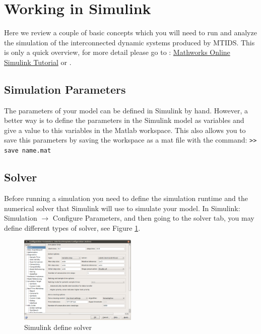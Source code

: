 \documentclass[a4paper,twoside, openright,12pt]{report}
\begin{document}
 

\section{Working in Simulink}\label{workinginsimulink}

Here we review a couple of basic concepts which you will need to run and analyze the simulation of the interconnected dynamic 
systems produced by MTIDS. This is only a quick overview, for more detail please go to : \href{http://www.mathworks.com/help/toolbox/simulink/simulink_product_page.html}{Mathworks Online Simulink Tutorial} or \cite{MatlabBuch}.

\subsection{Simulation Parameters}
The parameters of your model can be defined in Simulink by hand. However, a better way is to 
define the parameters in the Simulink model as variables and give a value to this variables in the Matlab workspace. This also allows you to save this parameters
by saving the workspace as a mat file with the command: \texttt{>> save name.mat}

\subsection{Solver} \label{solver}
Before running a simulation you need to define the simulation runtime and the numerical solver that Simulink will use to simulate your model.
In Simulink: Simulation $\rightarrow$ Configure Parameters, and then going to the solver tab, you may define different types of solver, see Figure \ref{simulink1Fig}.

\begin{figure}[htb]
\centering
\includegraphics[width=0.5\textwidth]{pics/screenSim1.eps}
\caption[Simulink define solver]{Simulink define solver}
\label{simulink1Fig}
\end{figure} 
\end{document}
